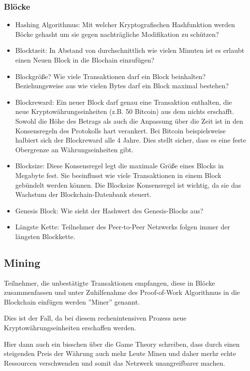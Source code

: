 \subsubsection{Blöcke}

\begin{itemize}
\item Hashing Algorithmus: Mit welcher Kryptografischen Hashfunktion werden Böcke gehasht um sie gegen nachträgliche Modifikation zu schützen? 
\item Blocktzeit: In Abstand von durchschnittlich wie vielen Minuten ist es erlaubt einen Neuen Block in die Blochain einzufügen?
\item Blockgröße? Wie viele Transaktionen darf ein Block beinhalten? Beziehungsweise aus wie vielen Bytes darf ein Block maximal bestehen? 
\item Blockreward: Ein neuer Block darf genau eine Transaktion enthalten, die neue Kryptowährungseinheiten (z.B. 50 Bitcoin) aus dem nichts erschafft. Sowohl die Höhe des Betrags als auch die Anpassung über die Zeit ist in den Konsensregeln des Protokolls hart verankert. Bei Bitcoin beispielsweise halbiert sich der Blockreward alle 4 Jahre. Dies stellt sicher, dass es eine feste Obergrenze an Währungseinheiten gibt.
\item Blocksize: Diese Konsensregel legt die maximale Größe eines Blocks in Megabyte fest. Sie beeinflusst  wie viele Transaktionen in einem Block gebündelt werden können. Die Blocksize Konsensregel ist wichtig, da sie das Wachstum der Blockchain-Datenbank steuert. 
\item Genesis Block: Wie sieht der Hashwert des Genesis-Blocks aus? 
\item Längste Kette: Teilnehmer des Peer-to-Peer Netzwerks folgen immer der längsten Blockkette. 
\end{itemize}

\subsection{Mining}

Teilnehmer, die unbestätigte Transaktionen empfangen, diese in Blöcke zusammenfassen und unter Zuhilfenahme des Proof-of-Work Algorithmus in die Blockchain einfügen werden ''Miner'' genannt.

Dies ist der Fall, da bei diesem rechenintensiven Prozess neue Kryptowährungseinheiten erschaffen werden.

Hier dann auch ein bisschen über die Game Theory schreiben, dass durch einen steigenden Preis der Währung auch mehr Leute Minen und daher merhr echte Ressourcen verschwenden und somit das Netzwerk unangreifbarer machen.

